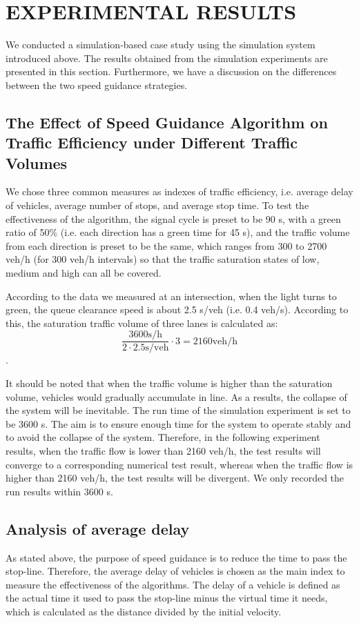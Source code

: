 \documentclass[10.5pt,compsoc]{TsT}
\theoremstyle{mystyle}
\begin{document}
{\section{EXPERIMENTAL RESULTS}
\noindent
We conducted a simulation-based case study using the simulation system
introduced above. The results obtained from the simulation experiments
are presented in this section. Furthermore, we have a discussion on the
differences between the two speed guidance strategies.

\subsection{The Effect of Speed Guidance Algorithm on Traffic Efficiency under Different Traffic Volumes}
\noindent
We chose three common measures as indexes of traffic efficiency, i.e.
average delay of vehicles, average number of stops, and average stop
time. To test the effectiveness of the algorithm, the signal cycle is
preset to be 90 s, with a green ratio of 50\% (i.e. each direction has a
green time for 45 s), and the traffic volume from each direction is
preset to be the same, which ranges from 300 to 2700 veh/h (for 300
veh/h intervals) so that the traffic saturation states of low, medium
and high can all be covered.

According to the data we measured at an intersection, when the light
turns to green, the queue clearance speed is about 2.5 s/veh (i.e. 0.4
veh/s). According to this, the saturation traffic volume of three lanes
is calculated as: 
$$\frac{3600 \mathrm{s/h}}{2 \cdot 2.5 \mathrm{s/veh}} \cdot 3 = 2160 \mathrm{veh/h}$$.

It should be noted that when the traffic volume is higher than the
saturation volume, vehicles would gradually accumulate in line. As a
results, the collapse of the system will be inevitable. The run time of
the simulation experiment is set to be 3600 s. The aim is to ensure
enough time for the system to operate stably and to avoid the collapse
of the system. Therefore, in the following experiment results, when the
traffic flow is lower than 2160 veh/h, the test results will converge to
a corresponding numerical test result, whereas when the traffic flow is
higher than 2160 veh/h, the test results will be divergent. We only
recorded the run results within 3600 s.

\subsection{Analysis of average delay}
\noindent
As stated above, the purpose of speed guidance is to reduce the time to
pass the stop-line. Therefore, the average delay of vehicles is chosen
as the main index to measure the effectiveness of the algorithms. The
delay of a vehicle is defined as the actual time it used to pass the
stop-line minus the virtual time it needs, which is calculated as the
distance divided by the initial velocity.

}
\end{document}
